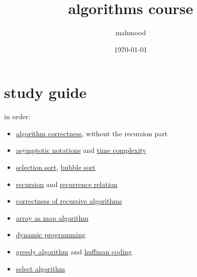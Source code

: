 \documentclass[a4paper,12pt]{article}
\author{mahmood}
\date{\today}
\title{algorithms course}
\begin{document}
\maketitle
\section{study guide}
\label{sec:org4f07005}
in order:\\
\begin{itemize}
\item \href{20221104220603-algorithm_correctness.org}{algorithm correctness}, without the recursion part\\
\item \href{20221203185351-asymptotic_notations.org}{asymptotic notations} and \href{20221130014441-time_complexity.org}{time complexity}\\
\item \href{20230204143447-selection_sort.org}{selection sort}, \href{20230204143813-bubble_sort.org}{bubble sort}\\
\item \href{20221105001640-recursive_function.org}{recursion} and \href{20230207143351-recurrence_relation.org}{recurrence relation}\\
\item \href{20221104220603-algorithm_correctness.org}{correctness of recursive algorithms}\\
\item \href{20230208201152-array_as_map.org}{array as map algorithm}\\
\item \href{20230102173117-dynamic_programming.org}{dynamic programming}\\
\item \href{20230118112408-greedy_algorithm.org}{greedy algorithm} and \href{20230119155506-huffman_coding.org}{huffman coding}\\
\item \href{20230120221836-select_algorithm.org}{select algorithm}\\
\end{itemize}
\end{document}
